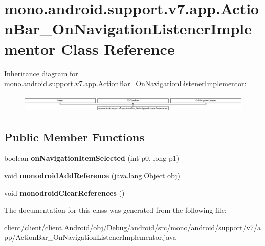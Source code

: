 \hypertarget{classmono_1_1android_1_1support_1_1v7_1_1app_1_1ActionBar__OnNavigationListenerImplementor}{}\section{mono.\+android.\+support.\+v7.\+app.\+Action\+Bar\+\_\+\+On\+Navigation\+Listener\+Implementor Class Reference}
\label{classmono_1_1android_1_1support_1_1v7_1_1app_1_1ActionBar__OnNavigationListenerImplementor}
Inheritance diagram for mono.\+android.\+support.\+v7.\+app.\+Action\+Bar\+\_\+\+On\+Navigation\+Listener\+Implementor\+:\begin{figure}[H]
\begin{center}
\leavevmode
\includegraphics[height=0.844646cm]{classmono_1_1android_1_1support_1_1v7_1_1app_1_1ActionBar__OnNavigationListenerImplementor}
\end{center}
\end{figure}
\subsection*{Public Member Functions}
\begin{DoxyCompactItemize}
\item 
\hypertarget{classmono_1_1android_1_1support_1_1v7_1_1app_1_1ActionBar__OnNavigationListenerImplementor_aa8e79b4e1839807bbcb095ce88841c8d}{}boolean {\bfseries on\+Navigation\+Item\+Selected} (int p0, long p1)\label{classmono_1_1android_1_1support_1_1v7_1_1app_1_1ActionBar__OnNavigationListenerImplementor_aa8e79b4e1839807bbcb095ce88841c8d}

\item 
\hypertarget{classmono_1_1android_1_1support_1_1v7_1_1app_1_1ActionBar__OnNavigationListenerImplementor_ab81ccc974aea244bca8ff1bd961c7f3d}{}void {\bfseries monodroid\+Add\+Reference} (java.\+lang.\+Object obj)\label{classmono_1_1android_1_1support_1_1v7_1_1app_1_1ActionBar__OnNavigationListenerImplementor_ab81ccc974aea244bca8ff1bd961c7f3d}

\item 
\hypertarget{classmono_1_1android_1_1support_1_1v7_1_1app_1_1ActionBar__OnNavigationListenerImplementor_a36832b5ba4a1ccf95e0e38fe4cab8587}{}void {\bfseries monodroid\+Clear\+References} ()\label{classmono_1_1android_1_1support_1_1v7_1_1app_1_1ActionBar__OnNavigationListenerImplementor_a36832b5ba4a1ccf95e0e38fe4cab8587}

\end{DoxyCompactItemize}


The documentation for this class was generated from the following file\+:\begin{DoxyCompactItemize}
\item 
client/client/client.\+Android/obj/\+Debug/android/src/mono/android/support/v7/app/Action\+Bar\+\_\+\+On\+Navigation\+Listener\+Implementor.\+java\end{DoxyCompactItemize}
